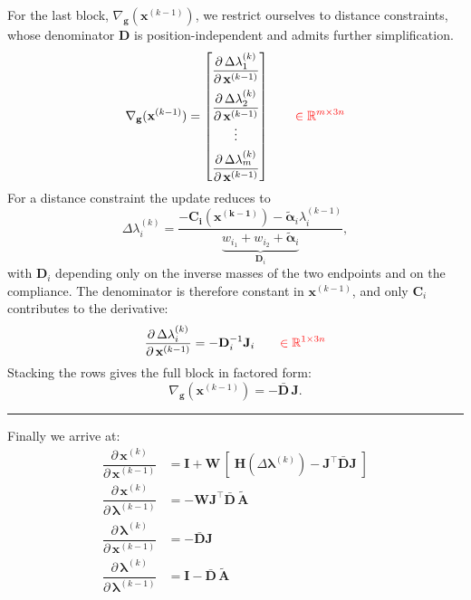 \documentclass{article}
\newcommand{\pd}[2]{\dfrac{\partial\, #1}{\partial\, #2}}
\newcommand{\red}[1]{\textcolor{red}{#1}}
\begin{document}
For the last block, $\nabla_\mathbf{g}(\mathbf{x}^{(k-1)})$, we restrict ourselves to distance constraints, whose denominator $\mathbf{D}$ is position-independent and admits further simplification.
\begin{equation}
    \nabla_\mathbf{g}(\mathbf{x}^{(k-1)}) = 
    \begin{bmatrix}
        \pd{\Delta\lambda_1^{(k)}}{\mathbf{x}^{(k-1)}} \\[2ex]
        \pd{\Delta\lambda_2^{(k)}}{\mathbf{x}^{(k-1)}} \\[1ex]
        \vdots \\[1ex]
        \pd{\Delta\lambda_m^{(k)}}{\mathbf{x}^{(k-1)}}
    \end{bmatrix}
    \qquad \red{\in \mathbb{R}^{m \times 3n}}
\end{equation}
For a distance constraint the update reduces to
\begin{equation*}
    \Delta \lambda_i^{(k)} = 
    \frac{-\mathbf{C_i(\mathbf{x}^{(k-1)})} - \tilde{\boldsymbol{\alpha}}_i\lambda_i^{(k-1)}}
    {\underbrace{
    w_{i_1} + w_{i_2} + \tilde{\boldsymbol{\alpha}}_i
    }_{\mathbf{D}_i}},
\end{equation*}
with $\mathbf{D}_i$ depending only on the inverse masses of the two endpoints and on the compliance. The denominator is therefore constant in $\mathbf{x}^{(k-1)}$, and only $\mathbf{C}_i$ contributes to the derivative:
\begin{equation}
    \pd{\Delta\lambda_i^{(k)}}{\mathbf{x}^{(k-1)}} = 
    -\mathbf{D}_i^{-1}\mathbf{J}_i 
    \qquad \red{\in \mathbb{R}^{1 \times 3n}}
\end{equation}
Stacking the rows gives the full block in factored form:
\begin{equation}
    \nabla_\mathbf{g}(\mathbf{x}^{(k-1)}) = -\bar{\mathbf{D}}\,\mathbf{J}.
\end{equation}

\noindent\rule{\linewidth}{0.4pt}
\vspace{0.5ex}

Finally we arrive at:
\begin{align}
    \pd{\mathbf{x}^{(k)}}{\mathbf{x}^{(k-1)}} &=
    \mathbf{I} + 
    \mathbf{W}\,[\;\mathbf{H}(\Delta\boldsymbol{\lambda}^{(k)}) - 
    \mathbf{J}^\top\bar{\mathbf{D}}\mathbf{J}\;] \\[2ex]
    \pd{\mathbf{x}^{(k)}}{\boldsymbol{\lambda}^{(k-1)}} &=
    -\mathbf{W}\mathbf{J}^\top \bar{\mathbf{D}}\,\tilde{\mathbf{A}} \\[2ex]
    \pd{\boldsymbol{\lambda}^{(k)}}{\mathbf{x}^{(k-1)}} &= -\bar{\mathbf{D}}\mathbf{J} \\[2ex]
     \pd{\boldsymbol{\lambda}^{(k)}}{\boldsymbol{\lambda}^{(k-1)}} &=
     \mathbf{I} - \bar{\mathbf{D}}\,\tilde{\mathbf{A}}
\end{align}
\end{document}
